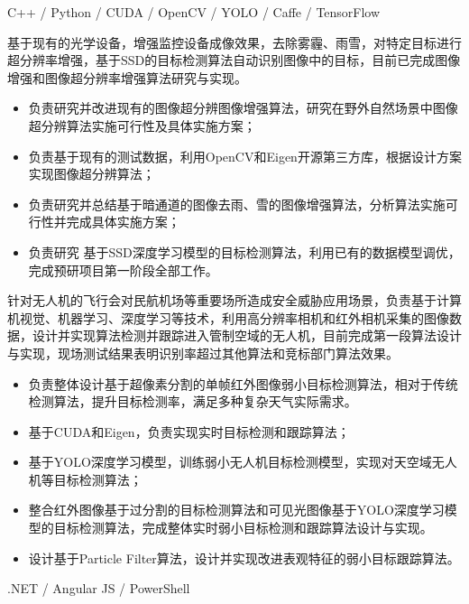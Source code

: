 \documentclass{resume}
\begin{document}
C++ / Python / CUDA / OpenCV / YOLO / Caffe / TensorFlow


基于现有的光学设备，增强监控设备成像效果，去除雾霾、雨雪，对特定目标进行超分辨率增强，基于SSD的目标检测算法自动识别图像中的目标，目前已完成图像增强和图像超分辨率增强算法研究与实现。
\begin{itemize}
  \item 负责研究并改进现有的图像超分辨图像增强算法，研究在野外自然场景中图像超分辨算法实施可行性及具体实施方案；
  \item 负责基于现有的测试数据，利用OpenCV和Eigen开源第三方库，根据设计方案实现图像超分辨算法；
  \item 负责研究并总结基于暗通道的图像去雨、雪的图像增强算法，分析算法实施可行性并完成具体实施方案；
  \item 负责研究 基于SSD深度学习模型的目标检测算法，利用已有的数据模型调优，完成预研项目第一阶段全部工作。
\end{itemize}



针对无人机的飞行会对民航机场等重要场所造成安全威胁应用场景，负责基于计算机视觉、机器学习、深度学习等技术，利用高分辨率相机和红外相机采集的图像数据，设计并实现算法检测并跟踪进入管制空域的无人机，目前完成第一段算法设计与实现，现场测试结果表明识别率超过其他算法和竞标部门算法效果。
\begin{itemize}
  \item 负责整体设计基于超像素分割的单帧红外图像弱小目标检测算法，相对于传统检测算法，提升目标检测率，满足多种复杂天气实际需求。
  \item 基于CUDA和Eigen，负责实现实时目标检测和跟踪算法；
  \item 基于YOLO深度学习模型，训练弱小无人机目标检测模型，实现对天空域无人机等目标检测算法；
  \item 整合红外图像基于过分割的目标检测算法和可见光图像基于YOLO深度学习模型的目标检测算法，完成整体实时弱小目标检测和跟踪算法设计与实现。
  \item 设计基于Particle Filter算法，设计并实现改进表观特征的弱小目标跟踪算法。
\end{itemize}

.NET / Angular JS / PowerShell
\end{document}
